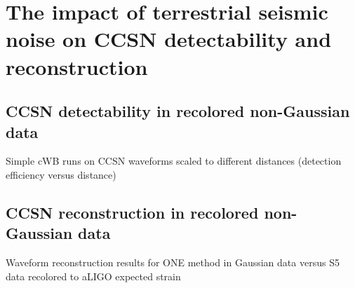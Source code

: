 \chapter{The impact of terrestrial seismic noise on CCSN detectability and reconstruction}

\section{CCSN detectability in recolored non-Gaussian data}
Simple cWB runs on CCSN waveforms scaled to different distances (detection efficiency versus distance) 
\section{CCSN reconstruction in recolored non-Gaussian data}
Waveform reconstruction results for ONE method in Gaussian data versus S5 data recolored to aLIGO expected strain
